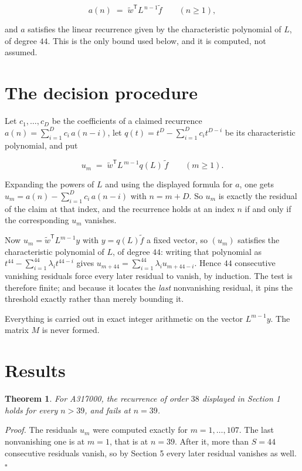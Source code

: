 \documentclass[11pt]{article}
\newtheorem{theorem}{Theorem}
\theoremstyle{definition}
\begin{document}
\[a(n) \;=\; \tilde w^{\mathsf T} L^{\,n-1} \tilde f \qquad (n \ge 1),\]

and $a$ satisfies the linear recurrence given by the characteristic polynomial of $L$, of degree $44$. This is the only bound used below, and it is computed, not assumed.

\section{The decision procedure}

Let $c_1,\dots,c_D$ be the coefficients of a claimed recurrence $a(n) = \sum_{i=1}^{D} c_i\,a(n-i)$, let $q(t) = t^{D} - \sum_{i=1}^{D} c_i t^{D-i}$ be its characteristic polynomial, and put

\[u_m \;=\; \tilde w^{\mathsf T} L^{\,m-1} q(L)\,\tilde f \qquad (m \ge 1).\]

Expanding the powers of $L$ and using the displayed formula for $a$, one gets $u_m = a(n) - \sum_{i=1}^{D} c_i\,a(n-i)$ with $n = m + D$. So $u_m$ is exactly the residual of the claim at that index, and the recurrence holds at an index $n$ if and only if the corresponding $u_m$ vanishes.

Now $u_m = \tilde w^{\mathsf T} L^{m-1} y$ with $y = q(L)\tilde f$ a fixed vector, so $(u_m)$ satisfies the characteristic polynomial of $L$, of degree $44$: writing that polynomial as $t^{44} - \sum_{i=1}^{44} \lambda_i t^{44-i}$ gives $u_{m+44} = \sum_{i=1}^{44} \lambda_i u_{m+44-i}$. Hence $44$ consecutive vanishing residuals force every later residual to vanish, by induction. The test is therefore finite; and because it locates the {\itshape last} nonvanishing residual, it pins the threshold exactly rather than merely bounding it.

Everything is carried out in exact integer arithmetic on the vector $L^{m-1}y$. The matrix $M$ is never formed.

\section{Results}

\begin{theorem} For A317000, the recurrence of order $38$ displayed in Section 1 holds for every $n > 39$, and fails at $n = 39$.\end{theorem}

{\itshape Proof.} The residuals $u_m$ were computed exactly for $m = 1,\dots,107$. The last nonvanishing one is at $m = 1$, that is at $n = 39$. After it, more than $S = 44$ consecutive residuals vanish, so by Section 5 every later residual vanishes as well. $\square$
\end{document}
